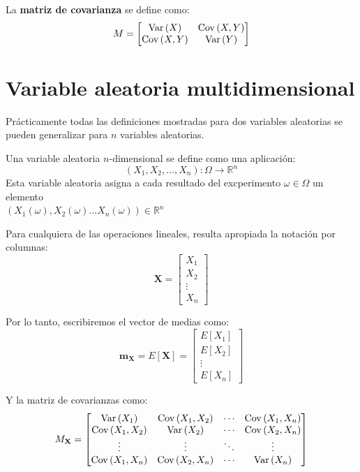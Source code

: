 \documentclass[a4paper]{book}
\renewcommand{\vec}[1]{\mathbf{#1}} %
\begin{document}
La \textbf{matriz de covarianza} se define como:
\[M=\left[
		\begin{matrix}
			\operatorname{Var} \left( X \right)   & \operatorname{Cov} \left( X,Y \right) \\
			\operatorname{Cov} \left( X,Y \right) & \operatorname{Var} \left( Y \right)
		\end{matrix} \right]\]

\section{Variable aleatoria multidimensional}

Prácticamente todas las definiciones mostradas para dos variables aleatorias se pueden generalizar para $n$ variables aleatorias.

Una variable aleatoria $n$-dimensional se define como una aplicación:
\[\left( X_1,X_2,\dots , X_n \right):\Omega \longrightarrow \mathbb{R}^n\]
Esta variable aleatoria asigna a cada resultado del excperimento $\omega \in \Omega$ un elemento\\ $\left( X_1(\omega ), X_2(\omega ) \dots X_n (\omega )\right)\in \mathbb{R}^n$

Para cualquiera de las operaciones lineales, resulta apropiada la notación por columnas:
\[\vec{X} = \left[
		\begin{matrix}
			X_1    \\
			X_2    \\
			\vdots \\
			X_n
		\end{matrix} \right]\]

Por lo tanto, escribiremos el vector de medias como:
\[\vec{m}_{\vec{X}} = E \left[ \vec{X} \right]= \left[
		\begin{matrix}
			E \left[ X_1 \right] \\
			E \left[ X_2 \right] \\
			\vdots               \\
			E \left[ X_n \right]
		\end{matrix} \right] \]

Y la matriz de covarianzas como:
\[ M_{\vec{X}} = \left[
		\begin{matrix}
			\Var \left( X_1 \right)      & \Cov \left( X_1, X_2 \right) & \cdots & \Cov \left( X_1, X_n \right) \\
			\Cov \left( X_1, X_2 \right) & \Var \left( X_2 \right)      & \cdots & \Cov \left( X_2, X_n \right) \\
			\vdots                       & \vdots                       & \ddots & \vdots                       \\
			\Cov \left( X_1,X_n \right)  & \Cov \left( X_2, X_n \right) & \cdots & \Var \left( X_n \right)
		\end{matrix} \right]\]
\end{document}
